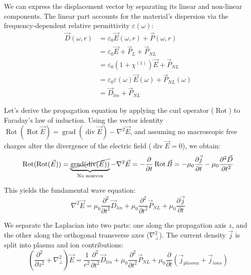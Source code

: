 \documentclass[11pt,a4paper]{article}
\begin{document}
We can express the displacement vector by separating its linear and non-linear components. The linear part accounts for the material's dispersion via the frequency-dependent relative permittivity $\varepsilon(\omega)$:
\begin{align}
\vec{D}(\omega, r) &= \varepsilon_0 \vec{E}(\omega, r) + \vec{P}(\omega, r) \nonumber \\
&= \varepsilon_0 \vec{E} + \vec{P}_L + \vec{P}_{NL} \nonumber \\
&= \varepsilon_0 \left(1 + \chi^{(1)}\right) \vec{E} + \vec{P}_{NL} \nonumber \\
&= \varepsilon_0 \varepsilon(\omega) \vec{E}(\omega) + \vec{P}_{NL}(\omega) \nonumber \\
&= \vec{D}_{lin} + \vec{P}_{NL}
\end{align}

Let's derive the propagation equation by applying the curl operator ($\operatorname{Rot}$) to Faraday's law of induction. Using the vector identity $\operatorname{Rot}(\operatorname{Rot} \vec{E}) = \operatorname{grad}(\operatorname{div} \vec{E}) - \nabla^2 \vec{E}$, and assuming no macroscopic free charges alter the divergence of the electric field ($\operatorname{div}\vec{E} = 0$), we obtain:
\begin{equation}
\operatorname{Rot}(\operatorname{Rot}(\vec{E})) = \underbrace{\cancel{\operatorname{grad}(\operatorname{div}(\vec{E}))}}_{\text{No sources}} - \nabla^2 \vec{E} = -\frac{\partial}{\partial t} \operatorname{Rot} \vec{B} = -\mu_0 \frac{\partial \vec{j}}{\partial t} - \mu_0 \frac{\partial^2 \vec{D}}{\partial t^2}
\end{equation}

This yields the fundamental wave equation:
\begin{equation}
\nabla^2 \vec{E} = \mu_0 \frac{\partial^2}{\partial t^2} \vec{D}_{lin} + \mu_0 \frac{\partial^2}{\partial t^2} \vec{P}_{NL} + \mu_0 \frac{\partial \vec{j}}{\partial t}
\end{equation}

We separate the Laplacian into two parts: one along the propagation axis $z$, and the other along the orthogonal transverse axes ($\nabla_\perp^2$). The current density $\vec{j}$ is split into plasma and ion contributions:
\begin{equation}
\left( \frac{\partial^2}{\partial z^2} + \nabla_\perp^2 \right) \vec{E} = \frac{1}{c^2} \frac{\partial^2}{\partial t^2} \vec{D}_{lin} + \mu_0 \frac{\partial^2}{\partial t^2} \vec{P}_{NL} + \mu_0 \frac{\partial}{\partial t} (\vec{j}_{plasma} + \vec{j}_{ions})
\end{equation}
\end{document}
